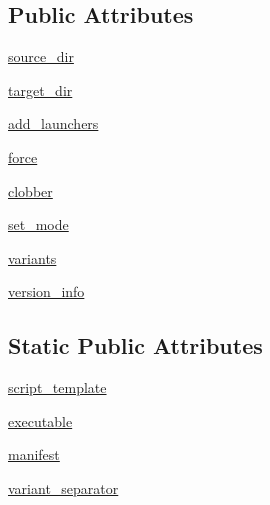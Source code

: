 \subsection*{Public Attributes}
\begin{DoxyCompactItemize}
\item 
\hyperlink{classpip_1_1__vendor_1_1distlib_1_1scripts_1_1ScriptMaker_a0764d3545df8f0f6fc799e7b74288f2d}{source\+\_\+dir}
\item 
\hyperlink{classpip_1_1__vendor_1_1distlib_1_1scripts_1_1ScriptMaker_a3d4b4faf9a08c77dacf2bcd864440387}{target\+\_\+dir}
\item 
\hyperlink{classpip_1_1__vendor_1_1distlib_1_1scripts_1_1ScriptMaker_add5715f7decd6425a02008bf4350a865}{add\+\_\+launchers}
\item 
\hyperlink{classpip_1_1__vendor_1_1distlib_1_1scripts_1_1ScriptMaker_a2caf961e8ffb982c5d22a1c90f9edfac}{force}
\item 
\hyperlink{classpip_1_1__vendor_1_1distlib_1_1scripts_1_1ScriptMaker_ab47fb378265e80c0fcdf3fc68f486f7a}{clobber}
\item 
\hyperlink{classpip_1_1__vendor_1_1distlib_1_1scripts_1_1ScriptMaker_a11002f930b358438eaca9e1d6416785d}{set\+\_\+mode}
\item 
\hyperlink{classpip_1_1__vendor_1_1distlib_1_1scripts_1_1ScriptMaker_a57bd1a59cea0189f22c60f5d5364b2e6}{variants}
\item 
\hyperlink{classpip_1_1__vendor_1_1distlib_1_1scripts_1_1ScriptMaker_ac23c1b8b01f6007817a6ffa5e75c9841}{version\+\_\+info}
\end{DoxyCompactItemize}
\subsection*{Static Public Attributes}
\begin{DoxyCompactItemize}
\item 
\hyperlink{classpip_1_1__vendor_1_1distlib_1_1scripts_1_1ScriptMaker_a7a825a0958165c02cbededf6de6d3d58}{script\+\_\+template}
\item 
\hyperlink{classpip_1_1__vendor_1_1distlib_1_1scripts_1_1ScriptMaker_aa7f400fe48dc91e6088280480b2311d4}{executable}
\item 
\hyperlink{classpip_1_1__vendor_1_1distlib_1_1scripts_1_1ScriptMaker_a43074bf0e9eb1b4df2bd0210250e0bd1}{manifest}
\item 
\hyperlink{classpip_1_1__vendor_1_1distlib_1_1scripts_1_1ScriptMaker_a7955494009a7c9a739cc41ce5aad031c}{variant\+\_\+separator}
\end{DoxyCompactItemize}


